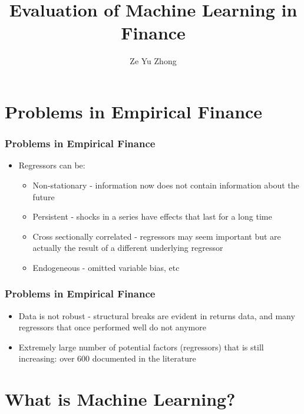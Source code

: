 \documentclass{beamer}
\title{Evaluation of Machine Learning in Finance}
\author{Ze Yu Zhong}
\begin{document}
	
\begin{frame}[plain]
    \maketitle
\end{frame}

\begin{frame}
	\tableofcontents
\end{frame}

\section{Problems in Empirical Finance}

\begin{frame}
\frametitle{Problems in Empirical Finance}
\begin{itemize}
	\item Regressors can be:
		\begin{itemize}
			\item Non-stationary - information now does not contain information about the future
			\item Persistent - shocks in a series have effects that last for a long time
			\item Cross sectionally correlated - regressors may seem important but are actually the result of a different underlying regressor
			\item Endogeneous - omitted variable bias, etc
		\end{itemize}

\end{itemize}
\end{frame}

\begin{frame}
\frametitle{Problems in Empirical Finance}
\begin{itemize}
	\item Data is not robust - structural breaks are evident in returns data, and many regressors that once performed well do not anymore
	\item Extremely large number of potential factors (regressors) that is still increasing: over 600 documented in the literature
\end{itemize}
\end{frame}

\section{What is Machine Learning?}
\end{document}
